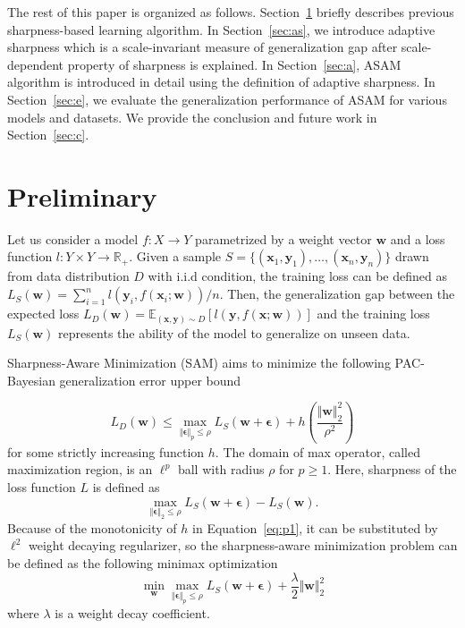 \documentclass{article}
\newcommand{\mf}[1]{\mathbf{#1}}
\begin{document}
The rest of this paper is organized as follows. Section~\ref{sec:p} briefly describes previous sharpness-based learning algorithm. In Section~\ref{sec:as}, we introduce adaptive sharpness which is a scale-invariant measure of generalization gap after scale-dependent property of sharpness is explained. In Section~\ref{sec:a}, ASAM algorithm is introduced in detail using the definition of adaptive sharpness.
In Section~\ref{sec:e}, we evaluate the generalization performance of ASAM for various models and datasets.
We provide the conclusion and future work in Section~\ref{sec:c}.




\section{Preliminary} \label{sec:p}
Let us consider a model $f:X\rightarrow Y$ parametrized by a weight vector $\mf{w}$ and a loss function $l:Y\times Y\rightarrow \mathbb{R}_+$.
Given a sample $S=\{(\mf{x}_1,\mf{y}_1),\ldots,(\mf{x}_n,\mf{y}_n)\}$ drawn from data distribution $D$ with i.i.d condition, the training loss can be defined as $L_S(\mf{w})=\sum_{i=1}^n l(\mf{y}_i,f(\mf{x}_i;\mf{w}))/n$.
Then, the generalization gap between the expected loss $L_D(\mf{w})=\mathbb{E}_{(\mf{x},\mf{y})\sim D}[l(\mf{y},f(\mf{x};\mf{w}))]$ and the training loss $L_S(\mf{w})$ represents the ability of the model to generalize on unseen data.

Sharpness-Aware Minimization (SAM) \citep{foret2021sharpnessaware} aims to minimize the following PAC-Bayesian generalization error upper bound

\begin{equation}\label{eq:p1}
    L_{D}(\mf{w}) \leq \max_{\Vert \bm{\epsilon}\Vert _{p} \leq \rho } L_{S}(\mf{w}+\bm{\epsilon}) + h\left(\frac{\Vert \mf{w}\Vert _{2}^2}{\rho^2}\right)
\end{equation}
for some strictly increasing function $h$.
The domain of max operator, called maximization region, is an $\ell^p$ ball with radius $\rho$ for $p \geq 1$.
Here, sharpness of the loss function $L$ is defined as
\begin{equation}\label{eq:s1}
    \max_{\Vert \bm{\epsilon} \Vert_{2} \leq \rho}L_S(\mf{w}+\bm{\epsilon}) - L_S(\mf{w}).
\end{equation}
Because of the monotonicity of $h$ in Equation~\ref{eq:p1}, it can be substituted by $\ell^2$ weight decaying regularizer, so the sharpness-aware minimization problem can be defined as the following minimax optimization
\[
    \min_{\mf{w}}\max_{\Vert \bm{\epsilon}\Vert _{p} \leq \rho }L_{S}(\mf{w} + \bm{\epsilon}) + \frac{\lambda}{2} \Vert \mf{w}\Vert _2^2
\]
\noindent where $\lambda$ is a weight decay coefficient.
\end{document}
